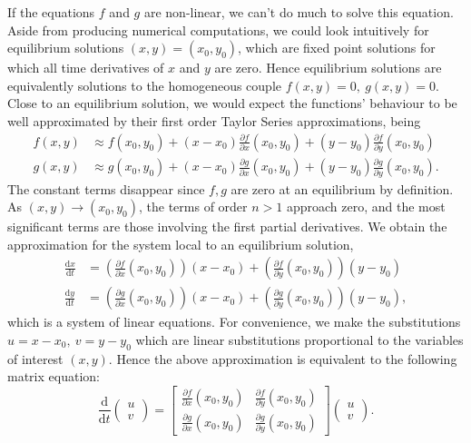 \documentclass{report}
\begin{document}
If the equations \(f\) and \(g\) are non-linear,
we can't do much to solve this equation.
Aside from producing numerical computations, we could look intuitively for equilibrium solutions \((x,y) = (x_0,y_0)\),
which are fixed point solutions for which all time derivatives of \(x\) and \(y\) are zero.
Hence equilibrium solutions are equivalently solutions to the homogeneous couple \(f(x,y) = 0,~g(x,y) = 0\).
Close to an equilibrium solution,
we would expect the functions' behaviour to be well approximated by their first order Taylor Series approximations, being
\begin{equation}
    \begin{aligned}
        f(x,y) &\approx f(x_0,y_0) + (x-x_0)\frac{\partial f}{\partial x}(x_0,y_0) + (y-y_0)\frac{\partial f}{\partial y}(x_0,y_0) \\
        g(x,y) &\approx g(x_0,y_0) + (x-x_0)\frac{\partial g}{\partial x}(x_0,y_0) + (y-y_0)\frac{\partial g}{\partial y}(x_0,y_0).
    \end{aligned}
\end{equation}
The constant terms disappear since \(f, g\) are zero at an equilibrium by definition.
As $(x,y) \rightarrow (x_0,y_0)$, the terms of order $n > 1$ approach zero,
and the most significant terms are those involving the first partial derivatives.
We obtain the approximation for the system local to an equilibrium solution,
\begin{equation}
    \begin{aligned}
        \frac{\mathrm{d}x}{\mathrm{d}t} &= \left(\frac{\partial f}{\partial x}(x_0,y_0)\right)(x-x_0) + \left(\frac{\partial f}{\partial y}(x_0,y_0)\right)(y-y_0) \\
        \frac{\mathrm{d}y}{\mathrm{d}t} &= \left(\frac{\partial g}{\partial x}(x_0,y_0)\right)(x-x_0) + \left(\frac{\partial g}{\partial y}(x_0,y_0)\right)(y-y_0),
    \end{aligned}
\end{equation}
which is a system of linear equations.
For convenience, we make the substitutions \(u = x-x_0,~v = y-y_0\) which are linear substitutions proportional to the variables of interest \((x,y)\).
Hence the above approximation is equivalent to the following matrix equation:
\begin{equation}
    \frac{\mathrm{d}}{\mathrm{d}t} \begin{pmatrix}
        u \\
        v
    \end{pmatrix} = \begin{bmatrix}
        \frac{\partial f}{\partial x}(x_0,y_0) & \frac{\partial f}{\partial y}(x_0,y_0) \\
        \frac{\partial g}{\partial x}(x_0,y_0) & \frac{\partial g}{\partial y}(x_0,y_0)
    \end{bmatrix} \begin{pmatrix}
        u \\
        v
    \end{pmatrix}.
\end{equation}
\end{document}
